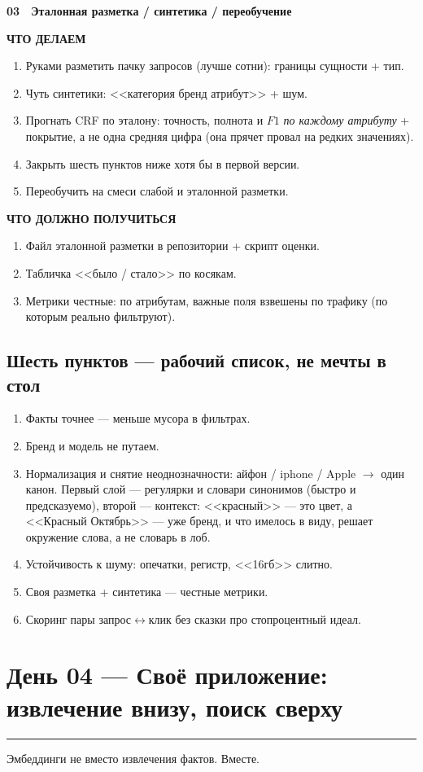 \documentclass[11pt,a4paper]{article}
\newcommand{\secrule}{%
  \par\vspace{4pt}%
  {\color{mvred}\noindent\rule{\linewidth}{0.9pt}\par}%
  \vspace{8pt}%
}
\newcommand{\daysection}[1]{%
  \Needspace{22\baselineskip}%
  \section{#1}\secrule
}
\newcommand{\dayblock}[4]{%
  \begin{tcolorbox}[
    enhanced,
    colback=white,
    colframe=rulec,
    boxrule=0.65pt,
    arc=2pt,
    left=8pt,
    right=8pt,
    top=8pt,
    bottom=8pt,
    before skip=3pt,
    after skip=11pt,
  ]
  {\color{mvred}\bfseries #1}~~{\bfseries #2}\par\vspace{4pt}%
  {\scriptsize\bfseries\color{inksoft}ЧТО ДЕЛАЕМ}\par\vspace{1pt}%
  #3\par\vspace{5pt}%
  {\scriptsize\bfseries\color{mint}ЧТО ДОЛЖНО ПОЛУЧИТЬСЯ}\par\vspace{1pt}%
  #4%
  \end{tcolorbox}%
}
\begin{document}
\dayblock{03}{Эталонная разметка / синтетика / переобучение}{%
\begin{enumerate}
  \item Руками разметить пачку запросов (лучше сотни): границы сущности + тип.
  \item Чуть синтетики: <<категория бренд атрибут>> + шум.
  \item Прогнать CRF по эталону: точность, полнота и $F1$ \emph{по каждому атрибуту} + покрытие, а не одна средняя цифра (она прячет провал на редких значениях).
  \item Закрыть шесть пунктов ниже хотя бы в первой версии.
  \item Переобучить на смеси слабой и эталонной разметки.
\end{enumerate}
}{%
\begin{enumerate}
  \item Файл эталонной разметки в репозитории + скрипт оценки.
  \item Табличка <<было / стало>> по косякам.
  \item Метрики честные: по атрибутам, важные поля взвешены по трафику (по которым реально фильтруют).
\end{enumerate}
}

\subsection*{Шесть пунктов --- рабочий список, не мечты в стол}
\begin{enumerate}
  \item Факты точнее --- меньше мусора в фильтрах.
  \item Бренд и модель не путаем.
  \item Нормализация и снятие неоднозначности: айфон / iphone / Apple $\to$ один канон. Первый слой --- регулярки и словари синонимов (быстро и предсказуемо), второй --- контекст: <<красный>> --- это цвет, а <<Красный Октябрь>> --- уже бренд, и что имелось в виду, решает окружение слова, а не словарь в лоб.
  \item Устойчивость к шуму: опечатки, регистр, <<16гб>> слитно.
  \item Своя разметка + синтетика --- честные метрики.
  \item Скоринг пары запрос$\leftrightarrow$клик без сказки про стопроцентный идеал.
\end{enumerate}

\daysection{День 04 --- Своё приложение: извлечение внизу, поиск сверху}
Эмбеддинги не вместо извлечения фактов. Вместе.
\end{document}
